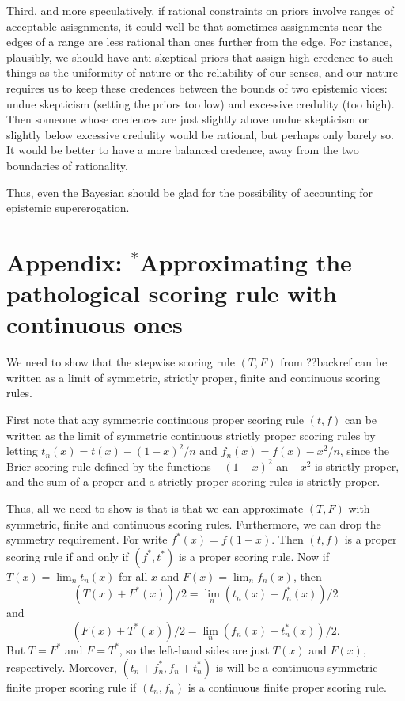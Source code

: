 Third, and more speculatively, if rational constraints on priors involve ranges of acceptable asisgnments, it could well be that 
sometimes assignments near the edges of a range are less rational than ones further from the edge. For instance, plausibly, we 
should have anti-skeptical priors that assign high credence to such things as the uniformity of nature or the reliability of 
our senses, and our nature requires us to keep these credences between the bounds of two epistemic vices: undue skepticism (setting 
the priors too low) and excessive credulity (too high). Then someone whose credences are just slightly above undue skepticism 
or slightly below excessive credulity would be rational, but perhaps only barely so. It would be better to have a more balanced
credence, away from the two boundaries of rationality.

Thus, even the Bayesian should be glad for the possibility of accounting for epistemic supererogation.

\section*{Appendix: $^*$Approximating the pathological scoring rule with continuous ones}
We need to show that the stepwise scoring rule $(T,F)$ from ??backref can be written as a limit of
symmetric, strictly proper, finite and continuous scoring rules. 

First note that any symmetric continuous proper scoring rule $(t,f)$ can be written as the limit of symmetric continuous
strictly proper scoring rules by letting $t_n(x)=t(x)-(1-x)^2/n$ and $f_n(x)=f(x)-x^2/n$, since the Brier scoring rule defined
by the functions $-(1-x)^2$ an $-x^2$ is strictly proper, and the sum of a proper and a strictly proper scoring rules is
strictly proper. 

Thus, all we need to show is that is that we can approximate $(T,F)$ with symmetric, finite and continuous scoring rules.
Furthermore, we can drop the symmetry requirement. For write $f^*(x)=f(1-x)$. Then $(t,f)$ is a proper scoring rule if and
only if $(f^*,t^*)$ is a proper scoring rule. Now if $T(x)=\lim_n t_n(x)$ for all $x$ and $F(x)=\lim_n f_n(x)$, then
$$
    (T(x)+F^*(x))/2 = \lim_n (t_n(x)+f_n^*(x))/2
$$    
    and
$$    
    (F(x)+T^*(x))/2 = \lim_n (f_n(x)+t_n^*(x))/2. 
$$    
But $T=F^*$ and $F=T^*$, so the left-hand sides are just $T(x)$ and $F(x)$, respectively. Moreover, $(t_n+f_n^*,f_n+t_n^*)$ is 
will be a continuous symmetric finite proper scoring rule if $(t_n,f_n)$ is a continuous finite proper scoring rule.

